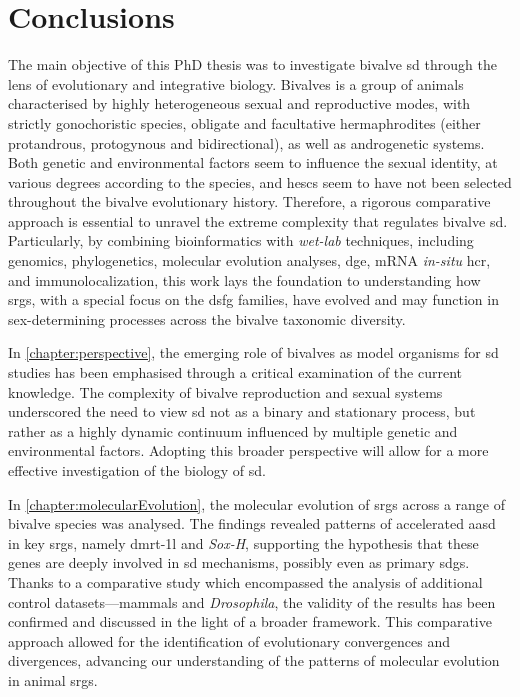 
% 

{
\chapter{Conclusions}
\label{chapter:conclusions}
}

The main objective of this PhD thesis was to investigate bivalve \gls{sd} through the lens of evolutionary and integrative biology. Bivalves is a group of animals characterised by highly heterogeneous sexual and reproductive modes, with strictly gonochoristic species, obligate and facultative hermaphrodites (either protandrous, protogynous and bidirectional), as well as androgenetic systems. Both genetic and environmental factors seem to influence the sexual identity, at various degrees according to the species, and \glspl{hesc} seem to have not been selected throughout the bivalve evolutionary history. Therefore, a rigorous comparative approach is essential to unravel the extreme complexity that regulates bivalve \gls{sd}. Particularly, by combining bioinformatics with \textit{wet-lab} techniques, including genomics, phylogenetics, molecular evolution analyses, \gls{dge}, mRNA \textit{in-situ} \gls{hcr}, and immunolocalization, this work lays the foundation to understanding how \glspl{srg}, with a special focus on the \gls{dsfg} families, have evolved and may function in sex-determining processes across the bivalve taxonomic diversity.

In \cref{chapter:perspective}, the emerging role of bivalves as model organisms for \gls{sd} studies has been emphasised through a critical examination of the current knowledge. The complexity of bivalve reproduction and sexual systems underscored the need to view \gls{sd} not as a binary and stationary process, but rather as a highly dynamic continuum influenced by multiple genetic and environmental factors. Adopting this broader perspective will allow for a more effective investigation of the biology of \gls{sd}.

In \cref{chapter:molecularEvolution}, the molecular evolution of \glspl{srg} across a range of bivalve species was analysed. The findings revealed patterns of accelerated \gls{aasd} in key \glspl{srg}, namely \gls{dmrt-1l} and \textit{Sox-H}, supporting the hypothesis that these genes are deeply involved in \gls{sd} mechanisms, possibly even as primary \glspl{sdg}. Thanks to a comparative study which encompassed the analysis of additional control datasets---mammals and \textit{Drosophila}, the validity of the results has been confirmed and discussed in the light of a broader framework. This comparative approach allowed for the identification of evolutionary convergences and divergences, advancing our understanding of the patterns of molecular evolution in animal \glspl{srg}.

